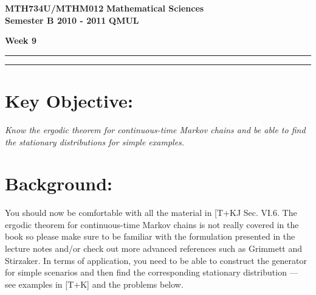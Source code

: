 \documentclass[11pt,a4paper]{article}
\begin{document}
  \textbf{MTH734U/MTHM012} \hfill \textbf{Mathematical Sciences}\\
  \textbf{Semester B 2010 - 2011} \hfill \textbf{QMUL}
  \begin{center}
    \textbf{\huge Week 9}
  \end{center}
  \hrule \vspace{2mm} \hrule
  \section*{Key Objective:}
  \textit{Know the ergodic theorem for continuous-time Markov chains and be able to find the stationary distributions for simple examples.}

  \section*{Background:}
  You should now be comfortable with all the material in [T+KJ Sec. VI.6. The ergodic theorem for continuous-time Markov chains is not really covered in the book so please make sure to be familiar with the formulation presented in the lecture notes and/or check out more advanced references such as Grimmett and Stirzaker. In terms of application, you need to be able to construct the generator for simple scenarios and then find the corresponding stationary distribution — see examples in [T+K] and the problems below.
\end{document}

